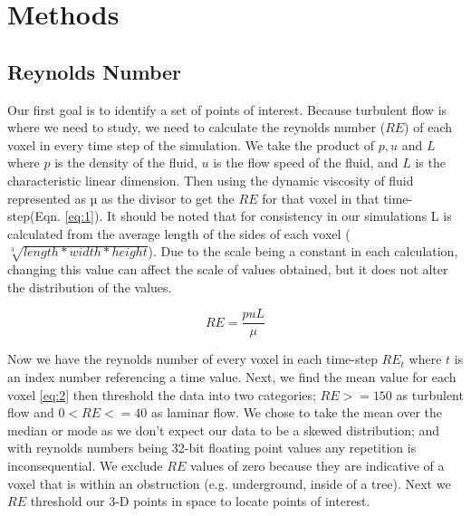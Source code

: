 
\chapter{Methods} %

\label{Chapter2} %


\section{Reynolds Number}

Our first goal is to identify a set of points of interest. Because turbulent flow is where we need to study, we need to calculate the reynolds number (\ensuremath{RE}) of each voxel in every time step of the simulation. We take the product of \ensuremath{p, u} and \ensuremath{L} where \ensuremath{p} is the density of the fluid, \ensuremath{u} is the flow speed of the fluid, and \ensuremath{L} is the characteristic linear dimension. Then using the dynamic viscosity of fluid represented as µ as the divisor to get the \ensuremath{RE} for that voxel in that time-step(Eqn. \ref{eq:1}). It should be noted that for consistency in our simulations L is calculated from the average length of the sides of each voxel (\ensuremath{\sqrt[3]{length * width * height}}). Due to the scale being a constant in each calculation, changing this value can affect the scale of values obtained, but it does not alter the distribution of the values. 


\begin{equation}\label{eq:1}
RE  = \frac{puL} {\mu} 
\end{equation}


Now we have the reynolds number of every voxel in each time-step \ensuremath{RE_t} where \ensuremath{t} is an index number referencing a time value. Next, we find the mean value for each voxel \ref{eq:2} then threshold the data into two categories; \ensuremath{RE >= 150} as turbulent flow and \ensuremath{0 < RE <= 40} as laminar flow. We chose to take the mean over the median or mode as we don't expect our data to be a skewed distribution; and with reynolds numbers being 32-bit floating point values any repetition is inconsequential. We exclude \ensuremath{RE} values of zero because they are indicative of a voxel that is within an obstruction (e.g. underground, inside of a tree). Next we \ensuremath{RE} threshold our 3-D points in space to locate points of interest.



